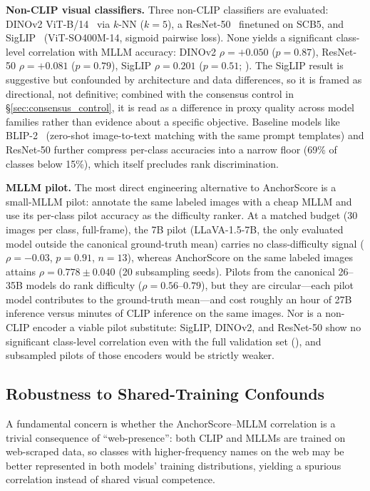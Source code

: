 \documentclass[a4paper,fleqn]{cas-sc}
\begin{document}
\textbf{Non-CLIP visual classifiers.} Three non-CLIP classifiers are evaluated: DINOv2 ViT-B/14~\cite{oquab2024dinov2} via $k$-NN ($k=5$), a ResNet-50~\cite{he2016deep} finetuned on SCB5, and SigLIP~\cite{zhai2023sigmoid} (ViT-SO400M-14, sigmoid pairwise loss). None yields a significant class-level correlation with MLLM accuracy: DINOv2 $\rho=+0.050$ ($p=0.87$), ResNet-50 $\rho=+0.081$ ($p=0.79$), SigLIP $\rho=0.201$ ($p=0.51$; ). The SigLIP result is suggestive but confounded by architecture and data differences, so it is framed as directional, not definitive; combined with the consensus control in \S\ref{sec:consensus_control}, it is read as a difference in proxy quality across model families rather than evidence about a specific objective. Baseline models like BLIP-2~\cite{li2023blip2} (zero-shot image-to-text matching with the same prompt templates) and ResNet-50 further compress per-class accuracies into a narrow floor (69\% of classes below 15\%), which itself precludes rank discrimination.

\textbf{MLLM pilot.} The most direct engineering alternative to AnchorScore is a small-MLLM pilot: annotate the same labeled images with a cheap MLLM and use its per-class pilot accuracy as the difficulty ranker. At a matched budget (30 images per class, full-frame), the 7B pilot (LLaVA-1.5-7B, the only evaluated model outside the canonical ground-truth mean) carries no class-difficulty signal ($\rho=-0.03$, $p=0.91$, $n=13$), whereas AnchorScore on the same labeled images attains $\rho=0.778\pm0.040$ (20 subsampling seeds). Pilots from the canonical 26--35B models do rank difficulty ($\rho=0.56$--$0.79$), but they are circular---each pilot model contributes to the ground-truth mean---and cost roughly an hour of 27B inference versus minutes of CLIP inference on the same images. Nor is a non-CLIP encoder a viable pilot substitute: SigLIP, DINOv2, and ResNet-50 show no significant class-level correlation even with the full validation set (), and subsampled pilots of those encoders would be strictly weaker.

\subsection{Robustness to Shared-Training Confounds}
\label{sec:shared_train}

A fundamental concern is whether the AnchorScore--MLLM correlation is a trivial consequence of ``web-presence'': both CLIP and MLLMs are trained on web-scraped data, so classes with higher-frequency names on the web may be better represented in both models' training distributions, yielding a spurious correlation instead of shared visual competence.
\end{document}
